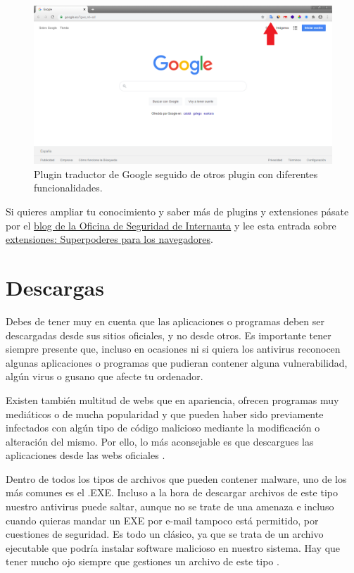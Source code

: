 \documentclass[
  spanish,
  a4paper,
  openany]{book}
\begin{document}
\begin{figure}

{\centering \includegraphics[width=0.75\linewidth]{images/plugin-navegador} 

}

\caption{Plugin traductor de Google seguido de otros plugin con diferentes funcionalidades.}\label{fig:unnamed-chunk-12}
\end{figure}

Si quieres ampliar tu conocimiento y saber más de plugins y extensiones pásate por el \href{https://www.osi.es/es/actualidad/blog}{blog de la Oficina de Seguridad de Internauta} y lee esta entrada sobre \href{https://www.osi.es/es/actualidad/blog/2019/11/20/extensiones-superpoderes-para-los-navegadores}{extensiones: Superpoderes para los navegadores}.

\hypertarget{descargas}{%
\section{Descargas}\label{descargas}}

Debes de tener muy en cuenta que las aplicaciones o programas deben ser descargadas desde sus sitios oficiales, y no desde otros. Es importante tener siempre presente que, incluso en ocasiones ni si quiera los antivirus reconocen algunas aplicaciones o programas que pudieran contener alguna vulnerabilidad, algún virus o gusano que afecte tu ordenador.

Existen también multitud de webs que en apariencia, ofrecen programas muy mediáticos o de mucha popularidad y que pueden haber sido previamente infectados con algún tipo de código malicioso mediante la modificación o alteración del mismo. Por ello, lo más aconsejable es que descargues las aplicaciones desde las webs oficiales \citep{software-alterado}.

Dentro de todos los tipos de archivos que pueden contener malware, uno de los más comunes es el .EXE. Incluso a la hora de descargar archivos de este tipo nuestro antivirus puede saltar, aunque no se trate de una amenaza e incluso cuando quieras mandar un EXE por e-mail tampoco está permitido, por cuestiones de seguridad. Es todo un clásico, ya que se trata de un archivo ejecutable que podría instalar software malicioso en nuestro sistema. Hay que tener mucho ojo siempre que gestiones un archivo de este tipo \citep{RZ-exe}.
\end{document}
